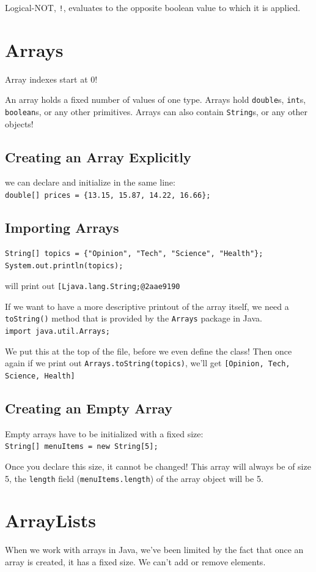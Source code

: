 \documentclass[a4paper, 12pt]{article}
\begin{document}
Logical-NOT, \verb|!|, evaluates to the opposite boolean value to which it is applied.


\section{Arrays}
Array indexes start at 0!

An array holds a fixed number of values of one type. Arrays hold \verb|double|s, \verb|int|s, \verb|boolean|s, or any other primitives. Arrays can also contain \verb|String|s, or any other objects!

\subsection{Creating an Array Explicitly}
we can declare and initialize in the same line:\\
\verb|double[] prices = {13.15, 15.87, 14.22, 16.66};|

\subsection{Importing Arrays}
\begin{verbatim}
String[] topics = {"Opinion", "Tech", "Science", "Health"};
System.out.println(topics);
\end{verbatim}
will print out \verb|[Ljava.lang.String;@2aae9190|

If we want to have a more descriptive printout of the array itself, we need a \verb|toString()| method that is provided by the \verb|Arrays| package in Java.\\
\verb|import java.util.Arrays;|

We put this at the top of the file, before we even define the class! Then once again if we print out \verb|Arrays.toString(topics)|, we'll get \verb|[Opinion, Tech, Science, Health]|

\subsection{Creating an Empty Array}
Empty arrays have to be initialized with a fixed size:\\
\verb|String[] menuItems = new String[5];|

Once you declare this size, it cannot be changed! This array will always be of size 5, the \verb|length| field (\verb|menuItems.length|) of the array object will be 5.


\section{ArrayLists}
When we work with arrays in Java, we've been limited by the fact that once an array is created, it has a fixed size. We can't add or remove elements.
\end{document}
